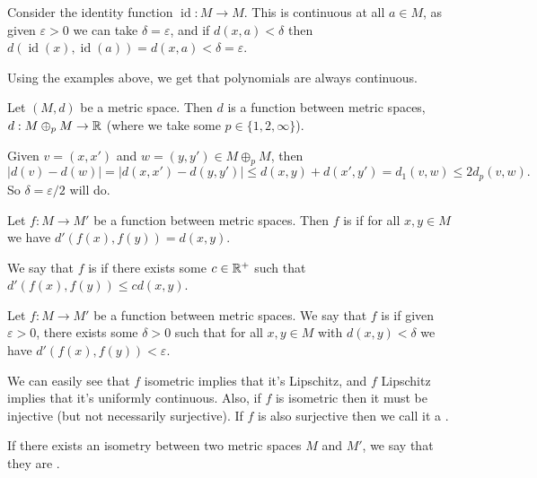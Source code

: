 \documentclass[a4paper]{scrartcl}
\begin{document}
\begin{example}
    Consider the identity function $\operatorname{id}: M \rightarrow M$. This is continuous at all $a \in M$, as given $\varepsilon > 0$ we can take $\delta = \varepsilon$, and if $d(x, a) < \delta$ then $d(\operatorname{id}(x), \operatorname{id}(a)) = d(x, a) < \delta = \varepsilon$.
\end{example}

\begin{example}[Polynomials]
    Using the examples above, we get that polynomials are always continuous.
\end{example}

\begin{example}
    Let $(M, d)$ be a metric space. Then $d$ is a function between metric spaces, $d: M \oplus_p M \rightarrow \mathbb{R}$ (where we take some $p \in \{1, 2, \infty\}$).

    Given $v = (x, x')$ and $w = (y, y') \in M \oplus_p M$, then
    $$|d(v) - d(w)| = |d(x, x') - d(y, y')| \leq d(x, y) + d(x', y') = d_1(v, w) \leq 2d_p(v, w).$$
    So $\delta = \varepsilon/2$ will do.
\end{example}

\begin{definition}
    Let $f: M \rightarrow M'$ be a function between metric spaces. Then $f$ is  if for all $x, y \in M$ we have $d'(f(x), f(y)) = d(x, y)$.

    We say that $f$ is  if there exists some $c \in \mathbb{R}^+$ such that $d'(f(x), f(y)) \leq cd(x, y)$.
\end{definition}

\begin{definition}
    Let $f: M \rightarrow M'$ be a function between metric spaces. We say that $f$ is  if given $\varepsilon > 0$, there exists some $\delta > 0$ such that for all $x, y \in M$ with $d(x, y) < \delta$ we have $d'(f(x), f(y)) < \varepsilon$. 
\end{definition}

We can easily see that $f$ isometric implies that it's Lipschitz, and $f$ Lipschitz implies that it's uniformly continuous. Also, if $f$ is isometric then it must be injective (but not necessarily surjective). If $f$ is also surjective then we call it a .

If there exists an isometry between two metric spaces $M$ and $M'$, we say that they are .
\end{document}
